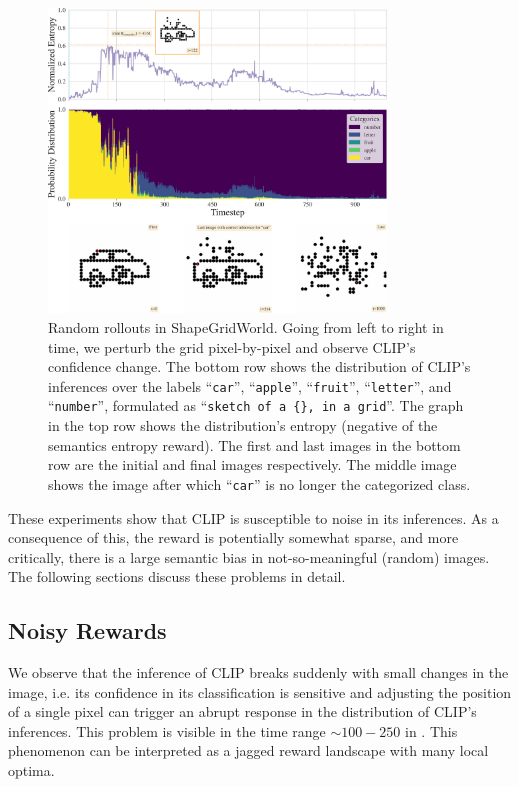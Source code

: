 \begin{figure}[h]
    \centering
    \includegraphics[width=0.8\textwidth]{images/sparse_rewards.pdf}
    \caption[Random rollouts in ShapeGridWorld.]{Random rollouts in ShapeGridWorld. Going from left to right in time, we perturb the grid pixel-by-pixel and observe CLIP's confidence change. The bottom row shows the distribution of CLIP's inferences over the labels ``\texttt{car}'', ``\texttt{apple}'', ``\texttt{fruit}'', ``\texttt{letter}'', and ``\texttt{number}'', formulated as ``\texttt{sketch of a \{\}, in a grid}''. The graph in the top row shows the distribution's entropy (negative of the semantics entropy reward). The first and last images in the bottom row are the initial and final images respectively.
    The middle image shows the image after which ``\texttt{car}'' is no longer the categorized class.}
    \label{fig:random-rollout}
\end{figure}

These experiments show that CLIP is susceptible to noise in its inferences.
As a consequence of this, the reward is potentially somewhat sparse, and more critically, there is a large semantic bias in not-so-meaningful (random) images.
The following sections discuss these problems in detail.

\subsection{Noisy Rewards} %
\label{sec:noisy-rewards}
We observe that the inference of CLIP breaks suddenly with small changes in the image, i.e. its confidence in its classification is sensitive and adjusting the position of a single pixel can trigger an abrupt response in the distribution of CLIP's inferences.
This problem is visible in the time range \(\sim 100 - 250\) in .
This phenomenon can be interpreted as a jagged reward landscape with many local optima.

